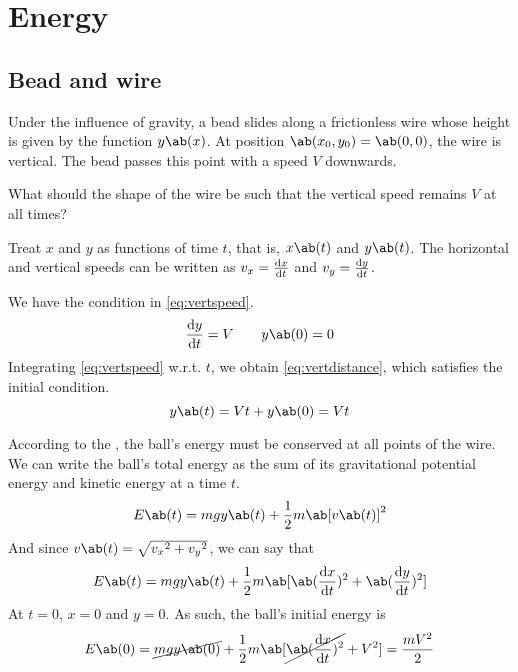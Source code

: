 \chapter{Energy}

\section{Bead and wire}
\begin{problem}
  Under the influence of gravity, a bead slides along a frictionless wire whose
  height is given by the function \(y\ab(x)\). At position \(\ab(x_0,
  y_0) = \ab(0,0)\),
  the wire is vertical. The bead passes this point with a speed
  \(V\) downwards.

  What should the shape of the wire be such that the vertical speed
  remains \(V\) at all times?
\end{problem}

Treat \(x\) and \(y\) as functions of time \(t\), that is,
\(x\ab(t)\) and \(y\ab(t)\). The horizontal and vertical speeds can
be written as \(v_x = \odv{x}{t}\) and \(v_y = \odv{y}{t}\).

We have the condition in \cref{eq:vertspeed}.
\begin{equation}
  \odv{y}{t} = V\qquad y\ab(0) = 0
  \label{eq:vertspeed}
\end{equation}
Integrating \cref{eq:vertspeed} w.r.t. \(t\), we obtain
\cref{eq:vertdistance}, which satisfies the initial condition.
\begin{equation}
  y\ab(t) = Vt + y\ab(0) = Vt
  \label{eq:vertdistance}
\end{equation}

According to the , the ball's
energy must be conserved at all points of the wire. We can write the
ball's total energy as the sum of its gravitational potential energy
and kinetic energy at a time \(t\).
\begin{equation*}
  E\ab(t) = mgy\ab(t) + \f{1}{2}m\ab[v\ab(t)]^2
\end{equation*}
And since \(v\ab(t) = \sqrt{{v_x}^2 + {v_y}^2}\), we can say that
\begin{equation}
  E\ab(t) = mgy\ab(t) + \f{1}{2}m\ab[\ab(\odv{x}{t})^2 +
  \ab(\odv{y}{t})^2]
\end{equation}
At \(t = 0\), \(x = 0\) and \(y = 0\). As such, the ball's initial energy is
\begin{align*}
  E\ab(0) = \cancel{mgy\ab(0)} +
  \f{1}{2}m\ab[\cancel{\ab(\odv{x}{t})^2} + V^2]
  = \f{mV^2}{2}
\end{align*}

